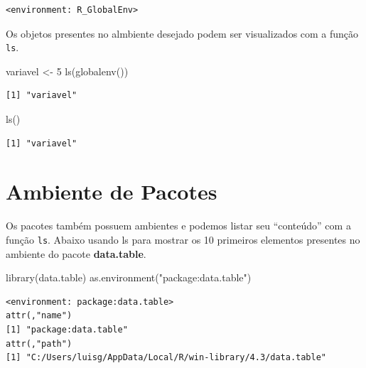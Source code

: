 \documentclass[
  letterpaper,
  DIV=11,
  numbers=noendperiod]{scrreprt}
\newenvironment{Shaded}{\begin{snugshade}}{\end{snugshade}}
\newcommand{\DecValTok}[1]{\textcolor[rgb]{0.68,0.00,0.00}{#1}}
\newcommand{\FunctionTok}[1]{\textcolor[rgb]{0.28,0.35,0.67}{#1}}
\newcommand{\NormalTok}[1]{\textcolor[rgb]{0.00,0.23,0.31}{#1}}
\newcommand{\OtherTok}[1]{\textcolor[rgb]{0.00,0.23,0.31}{#1}}
\newcommand{\StringTok}[1]{\textcolor[rgb]{0.13,0.47,0.30}{#1}}
\begin{document}
\begin{verbatim}
<environment: R_GlobalEnv>
\end{verbatim}

Os objetos presentes no almbiente desejado podem ser visualizados com a
função \texttt{ls}.

\begin{Shaded}
\begin{Highlighting}[]
\NormalTok{variavel }\OtherTok{\textless{}{-}} \DecValTok{5}
\FunctionTok{ls}\NormalTok{(}\FunctionTok{globalenv}\NormalTok{())}
\end{Highlighting}
\end{Shaded}

\begin{verbatim}
[1] "variavel"
\end{verbatim}

\begin{Shaded}
\begin{Highlighting}[]
\FunctionTok{ls}\NormalTok{()}
\end{Highlighting}
\end{Shaded}

\begin{verbatim}
[1] "variavel"
\end{verbatim}

\hypertarget{ambiente-de-pacotes}{%
\section{Ambiente de Pacotes}\label{ambiente-de-pacotes}}

Os pacotes também possuem ambientes e podemos listar seu ``conteúdo''
com a função \texttt{ls}. Abaixo usando ls para mostrar os 10 primeiros
elementos presentes no ambiente do pacote \textbf{data.table}.

\begin{Shaded}
\begin{Highlighting}[]
\FunctionTok{library}\NormalTok{(data.table)}
\FunctionTok{as.environment}\NormalTok{(}\StringTok{"package:data.table"}\NormalTok{)}
\end{Highlighting}
\end{Shaded}

\begin{verbatim}
<environment: package:data.table>
attr(,"name")
[1] "package:data.table"
attr(,"path")
[1] "C:/Users/luisg/AppData/Local/R/win-library/4.3/data.table"
\end{verbatim}
\end{document}
